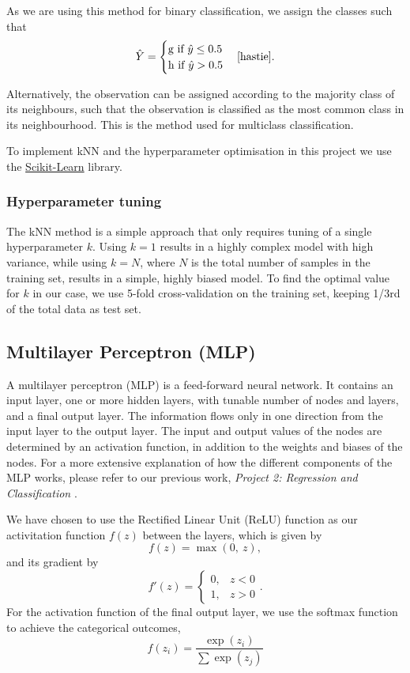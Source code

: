 \documentclass[a4paper, 11pt, twocolumn]{article}
\begin{document}
As we are using this method for binary classification, we assign the classes such
that
\begin{equation}
\hat{Y}=
\begin{cases}
      \text{g if }  \hat{y}\leq 0.5\\
      \text{h if } \hat{y} > 0.5
\end{cases} \cite{hastie}.
\end{equation}

Alternatively, the observation can be assigned according to the majority class of
its neighbours, such that the observation is classified as the most common class
in its neighbourhood. This is the method used for multiclass classification.

To implement kNN and the hyperparameter optimisation in this project we use the
\href{https://scikit-learn.org/stable}{Scikit-Learn}
library.

\subsubsection{Hyperparameter tuning}
The kNN method is a simple approach that only requires tuning of a single
hyperparameter $k$. Using $k=1$ results in a highly complex model with high
variance, while using $k=N$, where $N$ is the total number of samples in the
training set, results in a simple, highly biased model. To find the optimal value
for $k$ in our case, we use 5-fold cross-validation on the training set, keeping
1/3rd of the total data as test set.


\subsection{Multilayer Perceptron (MLP)}
A multilayer perceptron (MLP) is a feed-forward neural network. It contains an
input layer, one or more hidden layers, with tunable number of nodes and layers,
and a final output layer. The information flows only in one direction from the
input layer to the output layer. The input and output values of the nodes are
determined by an activation function, in addition to the weights and biases of
the nodes. For a more extensive explanation of how the different components of
the MLP works, please refer to our previous work, \textit{Project 2: Regression
and Classification} \cite{project2}.

We have chosen to use the Rectified Linear Unit (ReLU) function as our
activitation function $f(z)$ between the layers, which is given by
\begin{equation}
      f(z) = \max (0,\ z),
\end{equation}
and its gradient by
\begin{equation}
      f'(z) =
      \begin{cases}
            0, &  z<0\\
            1, &  z>0
      \end{cases}.
\end{equation}
For the activation function of the final output layer, we use the softmax
function to achieve the categorical outcomes,
\begin{equation}
      f(z_i)=\frac{\exp(z_i)}{\sum \exp(z_j)}
\end{equation}
\end{document}
